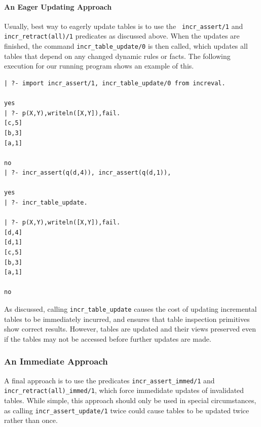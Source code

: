 \paragraph{An Eager Updating Approach}
%
Usually, best way to eagerly update tables is to use the {\tt
  incr\_assert/1} and {\tt incr\_retract(all)/1}
predicates as discussed above.  When the updates are finished, the
command {\tt incr\_table\_update/0} is then called, which updates all
tables that depend on any changed dynamic rules or facts.  The
following execution for our running program shows an example of this.

\begin{verbatim}
| ?- import incr_assert/1, incr_table_update/0 from increval.

yes
| ?- p(X,Y),writeln([X,Y]),fail.
[c,5]
[b,3]
[a,1]

no
| ?- incr_assert(q(d,4)), incr_assert(q(d,1)), 

yes
| ?- incr_table_update.

| ?- p(X,Y),writeln([X,Y]),fail.
[d,4]
[d,1]
[c,5]
[b,3]
[a,1]

no
\end{verbatim}
\noindent
As discussed, calling {\tt incr\_table\_update} causes the cost of
updating incremental tables to be immediately incurred, and ensures
that table inspection primitives show correct results.  However,
tables are updated and their views preserved even if the tables may
not be accessed before further updates are made.

\subsubsection{An Immediate Approach}
%
A final approach is to use the predicates {\tt incr\_assert\_immed/1}
and {\tt incr\_retract(all)\_immed/1}, which force immedidate updates
of invalidated tables.  While simple, this approach should only be
used in special circumstances, as calling {\tt incr\_assert\_update/1}
twice could cause tables to be updated twice rather than once.

